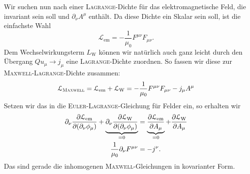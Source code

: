 Wir suchen nun nach einer \textsc{Lagrange}-Dichte für das elektromagnetische Feld, die invariant sein soll und $\partial_\nu A^\mu$ enthält. Da diese Dichte ein Skalar sein soll, ist die einfachste Wahl
\begin{equation*}
\mathcal{L}_\text{em}=-\frac{1}{\mu_0}F^{\mu\nu}F_{\mu\nu}.
\end{equation*}
Dem Wechselwirkungsterm $L_\text{W}$ können wir natürlich auch ganz leicht durch den Übergang $Qu_\mu\rightarrow j_\mu$ eine \textsc{Lagrange}-Dichte zuordnen. So fassen wir diese zur \textsc{Maxwell-Lagrange}-Dichte zusammen:
\begin{equation*}
\mathcal{L}_\textsc{Maxwell} = \mathcal{L}_\text{em} + \mathcal{L}_\text{W} =  -\frac{1}{\mu_0}F^{\mu\nu}F_{\mu\nu} - j_\mu A^\mu
\end{equation*}  
Setzen wir das in die \textsc{Euler-Lagrange}-Gleichung für Felder ein, so erhalten wir
\begin{align*}
\partial_\nu\frac{\partial{\mathcal{L}_\text{em}}}{\partial{(\partial_\nu\phi_\mu)}} + \underbrace{\partial_\nu\frac{\partial{\mathcal{L}_\text{W}}}{\partial{(\partial_\nu\phi_\mu)}}}_{=0} &= \underbrace{\frac{\partial{\mathcal{L}_\text{em}}}{\partial{A_\mu}}}_{=0} + \frac{\partial{\mathcal{L}_\text{W}}}{\partial{A_\mu}}\\
\frac{1}{\mu_0}\partial_\nu F^{\mu\nu} &= -j^\nu.
\end{align*}
Das sind gerade die inhomogenen \textsc{Maxwell}-Gleichungen in kovarianter Form. 